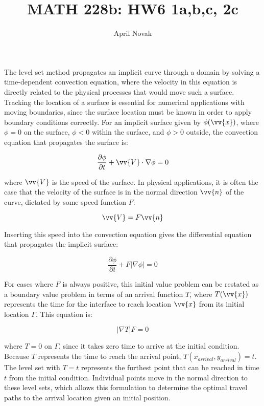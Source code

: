 \documentclass[10pt]{article}
\newcommand{\beq}{\begin{equation}}
\newcommand{\eeq}{\end{equation}}
\begin{document}
\title{MATH 228b: HW6 1a,b,c, 2c}
\author{April Novak}

\maketitle

\section{}
The level set method propagates an implicit curve through a domain by solving a time-dependent convection equation, where the velocity in this equation is directly related to the physical processes that would move such a surface. Tracking the location of a surface is essential for numerical applications with moving boundaries, since the surface location must be known in order to apply boundary conditions correctly. For an implicit surface given by \(\phi(\vv{x})\), where \(\phi=0\) on the surface, \(\phi<0\) within the surface, and \(\phi>0\) outside, the convection equation that propagates the surface is:

\beq
\frac{\partial\phi}{\partial t}+\vv{V}\cdot\nabla\phi=0
\eeq

where \(\vv{V}\) is the speed of the surface. In physical applications, it is often the case that the velocity of the surface is in the normal direction \(\vv{n}\) of the curve, dictated by some speed function \(F\):

\beq
\vv{V}=F\vv{n}
\eeq

Inserting this speed into the convection equation gives the differential equation that propagates the implicit surface:

\beq
\frac{\partial\phi}{\partial t}+F|\nabla\phi|=0
\eeq

For cases where \(F\) is always positive, this initial value problem can be restated as a boundary value problem in terms of an arrival function \(T\), where \(T(\vv{x})\) represents the time for the interface to reach location \(\vv{x}\) from its initial location \(\Gamma\). This equation is:

\beq
|\nabla T|F=0
\eeq

where \(T=0\) on \(\Gamma\), since it takes zero time to arrive at the initial condition. Because \(T\) represents the time to reach the arrival point, \(T(x_{arrival}, y_{arrival})=t\). The level set with \(T=t\) represents the furthest point that can be reached in time \(t\) from the initial condition. Individual points move in the normal direction to these level sets, which allows this formulation to determine the optimal travel paths to the arrival location given an initial position. 
\end{document}
